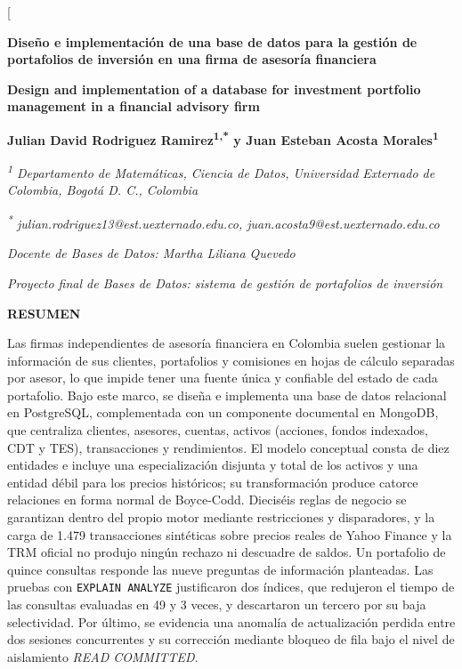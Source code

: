\documentclass[10pt,letterpaper]{article}
\renewcommand{\_}{\oldUS\allowbreak}
\begin{document}
\twocolumn[{%
\begin{center}
{\LARGE\bfseries Diseño e implementación de una base de datos para la gestión de portafolios de inversión en una firma de asesoría financiera\par}
\vspace{6pt}
{\large\bfseries Design and implementation of a database for investment portfolio management in a financial advisory firm\par}
\vspace{6pt}
{\bfseries Julian David Rodriguez Ramirez\textsuperscript{1,*} y Juan Esteban Acosta Morales\textsuperscript{1}}\par
\vspace{3pt}
{\small\itshape \textsuperscript{1} Departamento de Matemáticas, Ciencia de Datos, Universidad Externado de Colombia, Bogotá D. C., Colombia}\par
{\small\itshape \textsuperscript{*} julian.rodriguez13@est.uexternado.edu.co, juan.acosta9@est.uexternado.edu.co}\par
\vspace{3pt}
{\small\itshape Docente de Bases de Datos: Martha Liliana Quevedo}\par
\vspace{2pt}
{\small\itshape Proyecto final de Bases de Datos: sistema de gestión de portafolios de inversión}\par
\vspace{8pt}
{\small\bfseries RESUMEN}
\end{center}
\vspace{-4pt}
{\small
Las firmas independientes de asesoría financiera en Colombia suelen gestionar la información de sus clientes, portafolios y comisiones en hojas de cálculo separadas por asesor, lo que impide tener una fuente única y confiable del estado de cada portafolio. Bajo este marco, se diseña e implementa una base de datos relacional en PostgreSQL, complementada con un componente documental en MongoDB, que centraliza clientes, asesores, cuentas, activos (acciones, fondos indexados, CDT y TES), transacciones y rendimientos. El modelo conceptual consta de diez entidades e incluye una especialización disjunta y total de los activos y una entidad débil para los precios históricos; su transformación produce catorce relaciones en forma normal de Boyce-Codd. Dieciséis reglas de negocio se garantizan dentro del propio motor mediante restricciones y disparadores, y la carga de 1.479 transacciones sintéticas sobre precios reales de Yahoo Finance y la TRM oficial no produjo ningún rechazo ni descuadre de saldos. Un portafolio de quince consultas responde las nueve preguntas de información planteadas. Las pruebas con \texttt{EXPLAIN ANALYZE} justificaron dos índices, que redujeron el tiempo de las consultas evaluadas en 49 y 3 veces, y descartaron un tercero por su baja selectividad. Por último, se evidencia una anomalía de actualización perdida entre dos sesiones concurrentes y su corrección mediante bloqueo de fila bajo el nivel de aislamiento \textit{READ COMMITTED}.
}}
\end{document}
